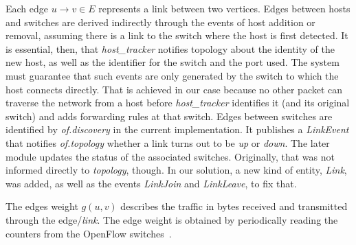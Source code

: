 Each edge $u \to v \in E$ represents a link between two vertices.
Edges between hosts and switches are derived indirectly through the events
of host addition or removal, assuming there is a link to the switch where
the host is first detected. It is essential, then, that
\emph{host\_tracker} notifies topology about the identity of the new host,
as well as the identifier for the switch and the port used. The system must
guarantee that such events are only generated by the switch to which the
host connects directly. That is achieved in our case because
no other packet can traverse the network from a host before
\emph{host\_tracker} identifies it (and its original switch) and adds
forwarding rules at that switch.
%
Edges between switches are identified by \emph{of.discovery} in the current
implementation. It publishes a \emph{LinkEvent} that notifies
\emph{of.topology} whether a link turns out to be \emph{up} or \emph{down}.
The later module updates the status of the associated switches. Originally,
that was not informed directly to \emph{topology}, though. In our solution,
a new kind of entity, \emph{Link}, was added, as well as the events
\emph{LinkJoin} and \emph{LinkLeave}, to fix that.

The edges weight $g(u, v)$ describes the traffic in bytes received and 
transmitted through the edge/\emph{link}.
The edge weight is obtained by periodically reading the counters from
the OpenFlow switches~\citep{openflow2013protocol}.
%

